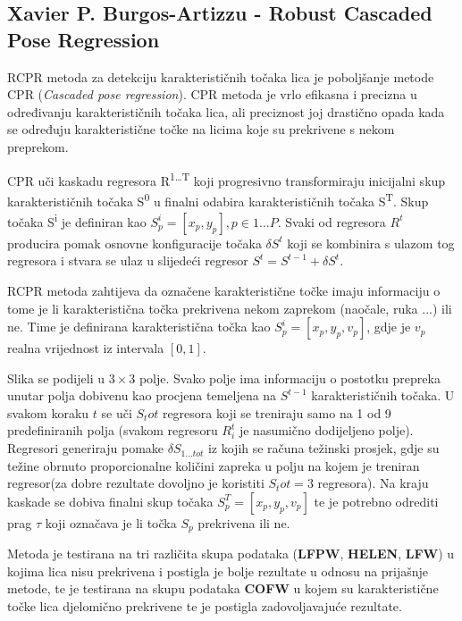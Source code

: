 \subsection{Xavier P. Burgos-Artizzu - Robust Cascaded Pose Regression}
RCPR metoda za detekciju karakterističnih točaka lica je poboljšanje metode CPR (\textit{Cascaded pose regression}). CPR metoda je vrlo efikasna i precizna u određivanju karakterističnih točaka lica, ali preciznost joj drastično opada kada se određuju karakteristične točke na licima koje su prekrivene s nekom preprekom. 

CPR uči kaskadu regresora R\textsuperscript{1\ldots T} koji progresivno transformiraju inicijalni skup karakterističnih točaka S\textsuperscript{0} u finalni odabira karakterističnih točaka S\textsuperscript{T}. Skup točaka S\textsuperscript{i} je definiran kao $ S_p^i = [x_p, y_p], p \in 1\ldots P$. Svaki od regresora $R^t$ producira pomak osnovne konfiguracije točaka $ \delta S^t$ koji se kombinira s ulazom tog regresora i stvara se ulaz u slijedeći regresor $S^t = S^{t-1} + \delta S^t$. 

RCPR metoda zahtijeva da označene karakteristične točke imaju informaciju o tome je li karakteristična točka prekrivena nekom zaprekom (naočale, ruka ...) ili ne. Time je definirana karakteristična točka kao $S_p^i = [x_p, y_p, v_p]$, gdje je $v_p$ realna vrijednost iz intervala $[0, 1]$.

Slika se podijeli u $3 \times 3$ polje. Svako polje ima informaciju o postotku prepreka unutar polja dobivenu kao procjena temeljena na $S^{t-1}$ karakterističnih točaka. U svakom koraku $t$ se uči $S_tot$ regresora koji se treniraju samo na 1 od 9 predefiniranih polja (svakom regresoru $R_i^t$ je nasumično dodijeljeno polje). Regresori generiraju pomake $\delta S_{1\ldots tot}$ iz kojih se računa težinski prosjek, gdje su težine obrnuto proporcionalne količini zapreka u polju na kojem je treniran regresor(za dobre rezultate dovoljno je koristiti $S_tot = 3$ regresora). Na kraju kaskade se dobiva finalni skup točaka $S_p^T = [x_p, y_p, v_p]$ te je potrebno odrediti prag $\tau$ koji označava je li točka $S_p$ prekrivena ili ne.

Metoda je testirana na tri različita skupa podataka (\textbf{LFPW}, \textbf{HELEN}, \textbf{LFW}) u kojima lica nisu prekrivena i postigla je bolje rezultate u odnosu na prijašnje metode, te je testirana na skupu podataka \textbf{COFW} u kojem su karakteristične točke lica djelomično prekrivene te je postigla zadovoljavajuće  rezultate.